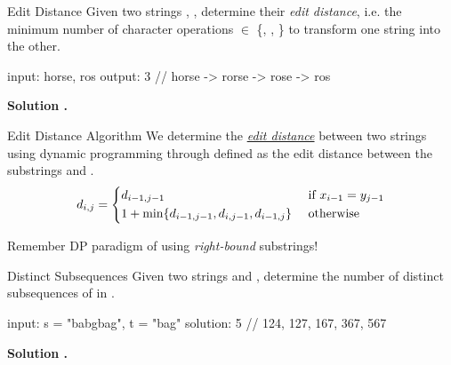 \documentclass{cognito}
\begin{document}

\begin{note}{Edit Distance}
	Given two strings , , determine their {\it edit distance}, i.e.
	the minimum number of character operations $\in$ \{, , \}
	to transform one string into the other.
	
	\begin{largecode}
 input: horse, ros
 output: 3  // horse -> rorse -> rose -> ros
	\end{largecode}
	\bf Solution \hyperref[note:Edit Distance Algorithm]{\solutionref}.
\end{note}

\begin{note}{Edit Distance Algorithm}
	We determine the \hyperref[note:Edit Distance]{\it edit distance} between two strings using dynamic programming
	through  defined as the edit distance between the substrings  and .
	$$
		d_{i,j} = \begin{dcases}
			d_{i-1,j-1} & \text{ if } x_{i-1} = y_{j-1}\\
			1 + \min\{d_{i-1,j-1}, d_{i,j-1},d_{i-1,j}\} & \text{ otherwise}
		\end{dcases}
	$$
	\vspace{-5pt}
	\begin{remark} Remember DP paradigm of using {\it right-bound} substrings!
	\end{remark}
	\vspace{-5pt}
\end{note}

\begin{note}{Distinct Subsequences}
	Given two strings  and , determine
	the number of distinct subsequences of  in .
	
	\begin{largecode}
 input: s = "babgbag", t = "bag"
 solution: 5  // 124, 127, 167, 367, 567
	\end{largecode}
	
	\bf Solution \hyperref[note:Distinct Subsequences DP]{\solutionref}.
\end{note}
\end{document}
